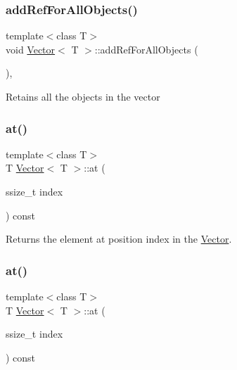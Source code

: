 \subsubsection{\texorpdfstring{add\+Ref\+For\+All\+Objects()}{addRefForAllObjects()}\hspace{0.1cm}{\footnotesize\ttfamily [2/2]}}
{\footnotesize\ttfamily template$<$class T$>$ \\
void \hyperlink{classVector}{Vector}$<$ T $>$\+::add\+Ref\+For\+All\+Objects (\begin{DoxyParamCaption}{ }\end{DoxyParamCaption})\hspace{0.3cm}{\ttfamily [inline]}, {\ttfamily [protected]}}

Retains all the objects in the vector \mbox{\label{classVector_a18868cf17d22de86d3f5a0569d774d2e}} 
\subsubsection{\texorpdfstring{at()}{at()}\hspace{0.1cm}{\footnotesize\ttfamily [1/2]}}
{\footnotesize\ttfamily template$<$class T$>$ \\
T \hyperlink{classVector}{Vector}$<$ T $>$\+::at (\begin{DoxyParamCaption}\item[{ssize\+\_\+t}]{index }\end{DoxyParamCaption}) const\hspace{0.3cm}{\ttfamily [inline]}}

Returns the element at position \textquotesingle{}index\textquotesingle{} in the \hyperlink{classVector}{Vector}. \mbox{\label{classVector_a18868cf17d22de86d3f5a0569d774d2e}} 
\subsubsection{\texorpdfstring{at()}{at()}\hspace{0.1cm}{\footnotesize\ttfamily [2/2]}}
{\footnotesize\ttfamily template$<$class T$>$ \\
T \hyperlink{classVector}{Vector}$<$ T $>$\+::at (\begin{DoxyParamCaption}\item[{ssize\+\_\+t}]{index }\end{DoxyParamCaption}) const\hspace{0.3cm}{\ttfamily [inline]}}

